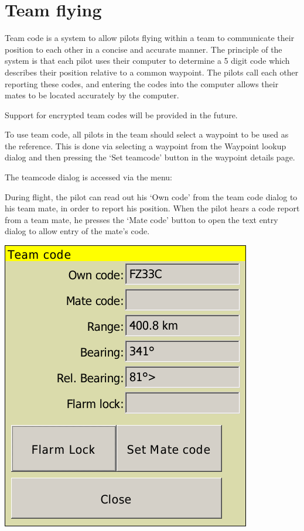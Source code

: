 \documentclass[a4paper,12pt]{refrep}
\begin{document}
\section{Team flying}

  Team code is a system to allow pilots flying within a team to
  communicate their position to each other in a concise and accurate
  manner.  The principle of the system is that each pilot uses their
  computer to determine a 5 digit code which describes their position
  relative to a common waypoint.  The pilots call each other reporting
  these codes, and entering the codes into the computer allows their
  mates to be located accurately by the computer.

  Support for encrypted team codes will be provided in the future.

  To use team code, all pilots in the team should select a waypoint to
  be used as the reference.  This is done via selecting a waypoint
  from the Waypoint lookup dialog and then pressing the `Set teamcode'
  button in the waypoint details page.

  The teamcode dialog is accessed via the menu:

   \blink{}\blink{}

  During flight, the pilot can read out his `Own code' from the team
  code dialog to his team mate, in order to report his position.  When
  the pilot hears a code report from a team mate, he presses the `Mate
  code' button to open the text entry dialog to allow entry of the
  mate's code.

\begin{center}
\includegraphics[angle=0,width=0.6\linewidth,keepaspectratio='true']{figures/fig-teamcode1.png}
\end{center}
\end{document}
